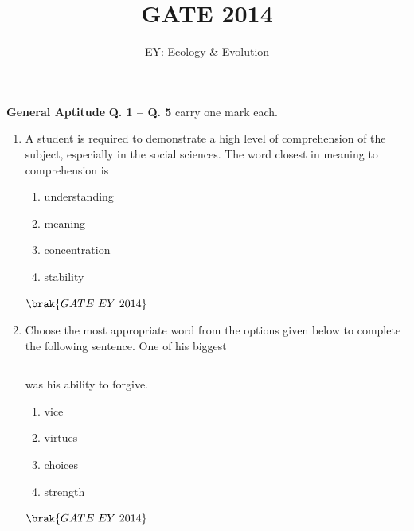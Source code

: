 \documentclass[journal]{IEEEtran}
\numberwithin{equation}{enumi}
\numberwithin{figure}{enumi}
\begin{document}

\vspace{3cm}

\title{GATE 2014}
\author{EY: Ecology \& Evolution}
\maketitle

\noindent \textbf{General Aptitude}
\newline
\newline
\noindent \textbf{Q. 1 -- Q. 5} carry one mark each.

\begin{enumerate}
    \item A student is required to demonstrate a high level of comprehension of the subject, especially in the social sciences. \newline The word closest in meaning to comprehension is
    \begin{multicols}{4}
    \begin{enumerate}
        \item understanding
        \item meaning
        \item concentration
        \item stability
    \end{enumerate}
    \end{multicols}
    \hfill{$\brak{ GATE\ EY\ 2014}$}
    \bigskip
    
    \item Choose the most appropriate word from the options given below to complete the following sentence. \newline One of his biggest \rule{3cm}{0.15mm} was his ability to forgive.
    \begin{multicols}{4}
    \begin{enumerate}
        \item vice
        \item virtues
        \item choices
        \item strength
    \end{enumerate}
    \end{multicols}
    \hfill{$\brak{ GATE\ EY\ 2014}$}
    \bigskip


\end{enumerate}
\end{document}
